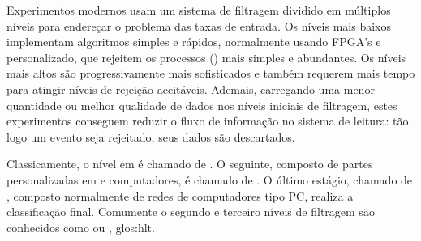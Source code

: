 Experimentos modernos usam um sistema de filtragem dividido em múltiplos
níveis para endereçar o problema das taxas de entrada. Os níveis mais baixos
implementam algoritmos simples e rápidos, normalmente usando FPGA's e
 personalizado, que rejeitem os processos ()
mais simples e abundantes. Os níveis mais altos são progressivamente mais
sofisticados e também requerem mais tempo para atingir níveis de rejeição
aceitáveis. Ademais, carregando uma menor quantidade ou melhor qualidade de
dados nos níveis iniciais de filtragem, estes experimentos conseguem reduzir o
fluxo de informação no sistema de leitura: tão logo um evento seja rejeitado,
seus dados são descartados.

Classicamente, o nível em  é chamado de . O
seguinte, composto de partes personalizadas em  e computadores,
é chamado de . O último estágio, chamado de
, composto normalmente de redes de computadores
tipo PC, realiza a classificação final. Comumente o segundo e terceiro níveis
de filtragem são conhecidos como  ou
, \gls{glos:hlt}.
